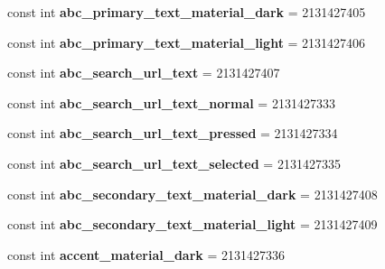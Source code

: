 \begin{DoxyCompactItemize}
const int {\bfseries abc\+\_\+primary\+\_\+text\+\_\+material\+\_\+dark} = 2131427405
\item 
\mbox{\label{classXaria_1_1Resource_1_1Color_ae09f27cb16aa0c5350e4ceeaf8bf95a6}} 
const int {\bfseries abc\+\_\+primary\+\_\+text\+\_\+material\+\_\+light} = 2131427406
\item 
\mbox{\label{classXaria_1_1Resource_1_1Color_a8a11406b1d1f064a82c6aa9094f4f909}} 
const int {\bfseries abc\+\_\+search\+\_\+url\+\_\+text} = 2131427407
\item 
\mbox{\label{classXaria_1_1Resource_1_1Color_a25a948e4e58d09997ae3f4820d44ee68}} 
const int {\bfseries abc\+\_\+search\+\_\+url\+\_\+text\+\_\+normal} = 2131427333
\item 
\mbox{\label{classXaria_1_1Resource_1_1Color_a346dc1d02d61506b777735af8505bab9}} 
const int {\bfseries abc\+\_\+search\+\_\+url\+\_\+text\+\_\+pressed} = 2131427334
\item 
\mbox{\label{classXaria_1_1Resource_1_1Color_ad85956f709bc7384cb07483edceedcea}} 
const int {\bfseries abc\+\_\+search\+\_\+url\+\_\+text\+\_\+selected} = 2131427335
\item 
\mbox{\label{classXaria_1_1Resource_1_1Color_a5a9ef417c942152cdde1505ca6464a53}} 
const int {\bfseries abc\+\_\+secondary\+\_\+text\+\_\+material\+\_\+dark} = 2131427408
\item 
\mbox{\label{classXaria_1_1Resource_1_1Color_ac2e628e7c2fadbb04390c589fc8ba98d}} 
const int {\bfseries abc\+\_\+secondary\+\_\+text\+\_\+material\+\_\+light} = 2131427409
\item 
\mbox{\label{classXaria_1_1Resource_1_1Color_a1e789267391520ce37e2c85253d86cb5}} 
const int {\bfseries accent\+\_\+material\+\_\+dark} = 2131427336
\item 
\mbox{\label{classXaria_1_1Resource_1_1Color_a591388d51c1d7c3e09b306973002ebae}} 

\end{DoxyCompactItemize}
